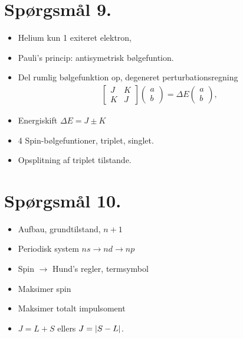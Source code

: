 \documentclass[a4paper,oneside,article]{memoir}
\begin{document}
\newpage
\section*{Spørgsmål 9.}
\begin{itemize}
    \item Helium kun 1 exiteret elektron, 
    \item Pauli's princip: antisymetrisk bølgefuntion. 
    \item Del rumlig bølgefunktion op, degeneret perturbationsregning 
    \begin{align*}
        \begin{bmatrix}
            J & K \\ K & J
        \end{bmatrix}
        \begin{pmatrix}
            a \\ b
        \end{pmatrix}
        = ΔE\begin{pmatrix}
            a \\ b 
        \end{pmatrix},
    \end{align*}
    \item Energiskift $ΔE = J \pm K$ 
\end{itemize}
\begin{itemize}
    \item 4 Spin-bølgefuntioner, triplet, singlet. 
    \item Opsplitning af triplet tilstande.
\end{itemize}

\newpage
\section*{Spørgsmål 10.}
\begin{itemize}
    \item Aufbau, grundtilstand, $n+1$
    \item Periodisk system $ns \rightarrow nd \rightarrow np$ 
    \item Spin $\rightarrow$ Hund's regler, termsymbol
\end{itemize}
\begin{itemize}
    \item Maksimer spin 
    \item Maksimer totalt impulsoment 
    \item $J = L+S$ ellers $J=\br[5]{S-L}$. 
\end{itemize}
\end{document}
